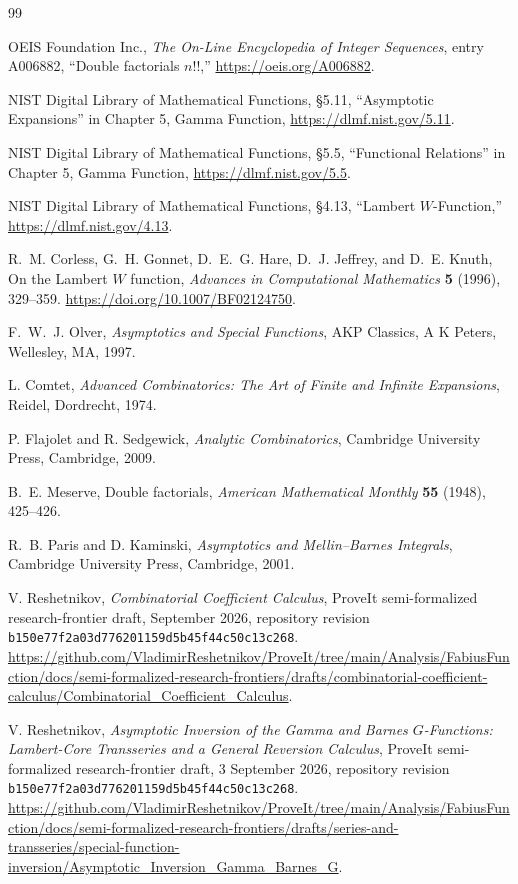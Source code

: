 \documentclass[11pt,a4paper,oneside]{article}
\theoremstyle{plain}
\theoremstyle{definition}
\theoremstyle{remark}
\begin{document}
\begin{thebibliography}{99}

OEIS Foundation Inc.,
\emph{The On-Line Encyclopedia of Integer Sequences},
entry A006882, ``Double factorials $n!!$,''
\url{https://oeis.org/A006882}.

NIST Digital Library of Mathematical Functions,
\S5.11, ``Asymptotic Expansions'' in Chapter 5, Gamma Function,
\url{https://dlmf.nist.gov/5.11}.

NIST Digital Library of Mathematical Functions,
\S5.5, ``Functional Relations'' in Chapter 5, Gamma Function,
\url{https://dlmf.nist.gov/5.5}.

NIST Digital Library of Mathematical Functions,
\S4.13, ``Lambert $W$-Function,''
\url{https://dlmf.nist.gov/4.13}.

R.~M. Corless, G.~H. Gonnet, D.~E.~G. Hare, D.~J. Jeffrey, and D.~E. Knuth,
On the Lambert $W$ function,
\emph{Advances in Computational Mathematics} \textbf{5} (1996), 329--359.
\url{https://doi.org/10.1007/BF02124750}.

F.~W.~J. Olver,
\emph{Asymptotics and Special Functions},
AKP Classics, A K Peters, Wellesley, MA, 1997.

L. Comtet,
\emph{Advanced Combinatorics: The Art of Finite and Infinite Expansions},
Reidel, Dordrecht, 1974.

P. Flajolet and R. Sedgewick,
\emph{Analytic Combinatorics},
Cambridge University Press, Cambridge, 2009.

B.~E. Meserve,
Double factorials,
\emph{American Mathematical Monthly} \textbf{55} (1948), 425--426.

R.~B. Paris and D. Kaminski,
\emph{Asymptotics and Mellin--Barnes Integrals},
Cambridge University Press, Cambridge, 2001.

V. Reshetnikov,
\emph{Combinatorial Coefficient Calculus},
ProveIt semi-formalized research-frontier draft, September 2026,
repository revision \texttt{b150e77f2a03d776201159d5b45f44c50c13c268}.
\url{https://github.com/VladimirReshetnikov/ProveIt/tree/main/Analysis/FabiusFunction/docs/semi-formalized-research-frontiers/drafts/combinatorial-coefficient-calculus/Combinatorial_Coefficient_Calculus}.

V. Reshetnikov,
\emph{Asymptotic Inversion of the Gamma and Barnes $G$-Functions:
Lambert-Core Transseries and a General Reversion Calculus},
ProveIt semi-formalized research-frontier draft, 3 September 2026,
repository revision \texttt{b150e77f2a03d776201159d5b45f44c50c13c268}.
\url{https://github.com/VladimirReshetnikov/ProveIt/tree/main/Analysis/FabiusFunction/docs/semi-formalized-research-frontiers/drafts/series-and-transseries/special-function-inversion/Asymptotic_Inversion_Gamma_Barnes_G}.

\end{thebibliography}
\end{document}
